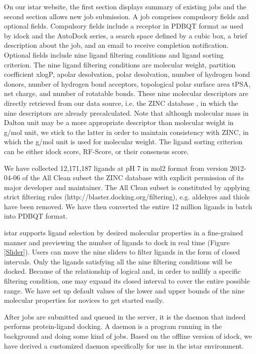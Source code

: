 \documentclass[10pt]{article}
\begin{document}
On our istar website, the first section displays summary of existing jobs and the second section allows new job submission. A job comprises compulsory fields and optional fields. Compulsory fields include a receptor in PDBQT format as used by idock and the AutoDock series, a search space defined by a cubic box, a brief description about the job, and an email to receive completion notification. Optional fields include nine ligand filtering conditions and ligand sorting criterion. The nine ligand filtering conditions are molecular weight, partition coefficient xlogP, apolar desolvation, polar desolvation, number of hydrogen bond donors, number of hydrogen bond acceptors, topological polar surface area tPSA, net charge, and number of rotatable bonds. These nine molecular descriptors are directly retrieved from our data source, i.e. the ZINC database \cite{532,1178}, in which the nine descriptors are already precalculated. Note that although molecular mass in Dalton unit may be a more appropriate descriptor than molecular weight in g/mol unit, we stick to the latter in order to maintain consistency with ZINC, in which the g/mol unit is used for molecular weight. The ligand sorting criterion can be either idock score, RF-Score, or their consensus score.

We have collected 12,171,187 ligands at pH 7 in mol2 format from version 2012-04-06 of the All Clean subset the ZINC database \cite{532,1178} with explicit permission of its major developer and maintainer. The All Clean subset is constituted by applying strict filtering rules (http://blaster.docking.org/filtering), e.g. aldehyes and thiols have been removed. We have then converted the entire 12 million ligands in batch into PDBQT format.

istar supports ligand selection by desired molecular properties in a fine-grained manner and previewing the number of ligands to dock in real time (Figure \ref{Slider}). Users can move the nine sliders to filter ligands in the form of closed intervals. Only the ligands satisfying all the nine filtering conditions will be docked. Because of the relationship of logical and, in order to nullify a specific filtering condition, one may expand its closed interval to cover the entire possible range. We have set up default values of the lower and upper bounds of the nine molecular properties for novices to get started easily.

After jobs are submitted and queued in the server, it is the daemon that indeed performs protein-ligand docking. A daemon is a program running in the background and doing some kind of jobs. Based on the offline version of idock, we have derived a customized daemon specifically for use in the istar environment.
\end{document}
